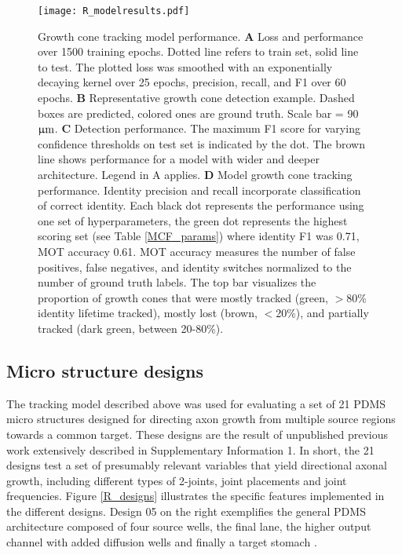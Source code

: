 \begin{figure}[h!]
    \texttt{[image: R\_modelresults.pdf]}
    \caption[Growth cone tracking model performance]
        {Growth cone tracking model performance. \textbf{A} Loss and performance
        over 1500 training epochs. Dotted line refers to train set, solid line
        to test. The plotted loss was smoothed with an exponentially decaying
        kernel over 25 epochs, precision, recall, and F1 over 60 epochs.
        \textbf{B} Representative growth cone detection example. Dashed boxes
        are predicted, colored ones are ground truth. Scale bar = 90 $\rm \upmu
        m$. \textbf{C} Detection performance. The maximum F1 score for varying
        confidence thresholds on test set is indicated by the dot. The brown
        line shows performance for a model with wider and deeper architecture.
        Legend in A applies. \textbf{D} Model growth cone tracking performance.
        Identity precision and recall incorporate classification of correct
        identity. Each black dot represents the performance using one set of
        hyperparameters, the green dot represents the highest scoring set (see
        Table \ref{MCF_params}) where identity F1 was 0.71, MOT accuracy 0.61.
        MOT accuracy measures the number of false positives, false negatives,
        and identity switches normalized to the number of ground truth labels.
        The top bar visualizes the proportion of growth cones that were mostly
        tracked (green, $>$80\% identity lifetime tracked), mostly lost (brown,
        $<$20\%), and partially tracked (dark green, between 20-80\%).
        } 
    \label{R_modelresults}
\end{figure}

\subsection{Micro structure designs}
The tracking model described above was used for evaluating a set of 21 PDMS
micro structures designed for directing axon growth from multiple source regions
towards a common target. These designs are the result of unpublished previous
work extensively described in Supplementary Information 1. In short, the 21
designs test a set of presumably relevant variables that yield directional
axonal growth, including different types of 2-joints, joint placements and joint
frequencies. Figure \ref{R_designs} illustrates the specific features
implemented in the different designs. Design 05 on the right exemplifies the
general PDMS architecture composed of four source wells, the final lane,
the higher output channel with added diffusion wells and finally a target
stomach \parencite{forro}. 

